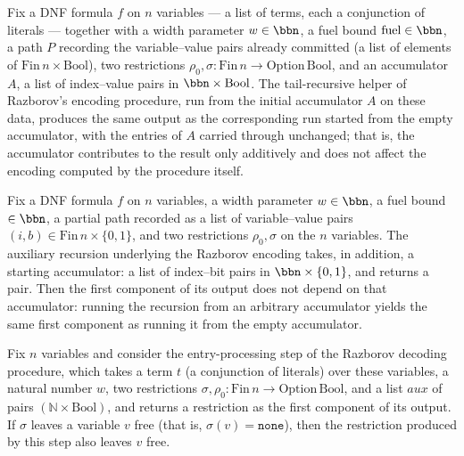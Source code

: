\begin{lemma}
\label{SwitchingLemma.encode_go_acc}
\leanok
{}
Fix a DNF formula $f$ on $n$ variables — a list of terms, each a conjunction of literals
— together with a width parameter $w \in \bbn$, a fuel bound $\mathrm{fuel} \in \bbn$, a
path $P$ recording the variable–value pairs already committed (a list of elements of
$\mathrm{Fin}\,n \times \mathrm{Bool}$), two restrictions $\rho_0, \sigma :
\mathrm{Fin}\,n \to \mathrm{Option}\,\mathrm{Bool}$, and an accumulator $A$, a list of
index–value pairs in $\bbn \times \mathrm{Bool}$. The tail-recursive helper of
Razborov's encoding procedure, run from the initial accumulator $A$ on these data,
produces the same output as the corresponding run started from the empty accumulator,
with the entries of $A$ carried through unchanged; that is, the accumulator contributes
to the result only additively and does not affect the encoding computed by the procedure
itself.
\end{lemma}

\begin{lemma}
\label{SwitchingLemma.encode_go_fst_acc}
\leanok
{}
Fix a DNF formula $f$ on $n$ variables, a width parameter $w \in \bbn$, a fuel bound
$\in \bbn$, a partial path recorded as a list of variable–value pairs $(i,b) \in
\mathrm{Fin}\,n \times \{0,1\}$, and two restrictions $\rho_0, \sigma$ on the $n$
variables. The auxiliary recursion underlying the Razborov encoding takes, in addition,
a starting accumulator: a list of index–bit pairs in $\bbn \times \{0,1\}$, and returns
a pair. Then the first component of its output does not depend on that accumulator:
running the recursion from an arbitrary accumulator yields the same first component as
running it from the empty accumulator.
\end{lemma}

\begin{lemma}
\label{SwitchingLemma.processEntries_preserves_none}
\leanok
{}
Fix $n$ variables and consider the entry-processing step of the Razborov decoding
procedure, which takes a term $t$ (a conjunction of literals) over these variables, a
natural number $w$, two restrictions $\sigma, \rho_0 \colon \mathrm{Fin}\,n \to
\mathrm{Option}\,\mathrm{Bool}$, and a list $\mathit{aux}$ of pairs $(\mathbb{N} \times
\mathrm{Bool})$, and returns a restriction as the first component of its output. If
$\sigma$ leaves a variable $v$ free (that is, $\sigma(v) = \mathtt{none}$), then the
restriction produced by this step also leaves $v$ free.
\end{lemma}

